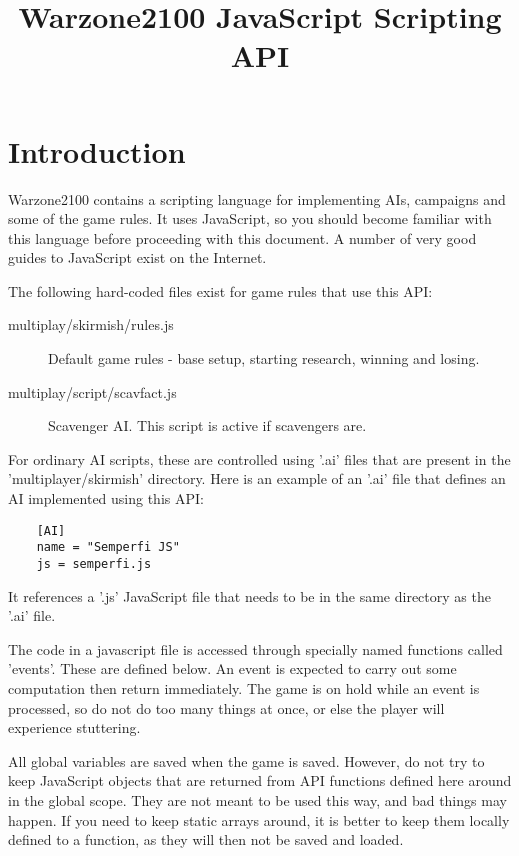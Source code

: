 \documentclass[12pt]{article}
\title{Warzone2100 JavaScript Scripting API}
\date{}
\begin{document}
\maketitle

\section{Introduction}

Warzone2100 contains a scripting language for implementing AIs, campaigns and some of the game
rules. It uses JavaScript, so you should become familiar with this language before proceeding
with this document. A number of very good guides to JavaScript exist on the Internet.

The following hard-coded files exist for game rules that use this API:

\begin{description}
	\item[multiplay/skirmish/rules.js] Default game rules - base setup, starting research, winning and losing.
	\item[multiplay/script/scavfact.js] Scavenger AI. This script is active if scavengers are.
\end{description}

For ordinary AI scripts, these are controlled using '.ai' files that are present in the 'multiplayer/skirmish'
directory. Here is an example of an '.ai' file that defines an AI implemented using this API:

\begin{verbatim}
	[AI]
	name = "Semperfi JS"
	js = semperfi.js
\end{verbatim}

It references a '.js' JavaScript file that needs to be in the same directory as the '.ai' file. 

The code in a javascript file is accessed through specially named functions called 'events'. These are defined below. 
An event is expected to carry out some computation then return immediately. The game is on hold while an event is 
processed, so do not do too many things at once, or else the player will experience stuttering.

All global variables are saved when the game is saved. However, do not try to keep JavaScript objects that are
returned from API functions defined here around in the global scope. They are not meant to be used this way, and
bad things may happen. If you need to keep static arrays around, it is better to keep them locally defined to a
function, as they will then not be saved and loaded.
\end{document}
